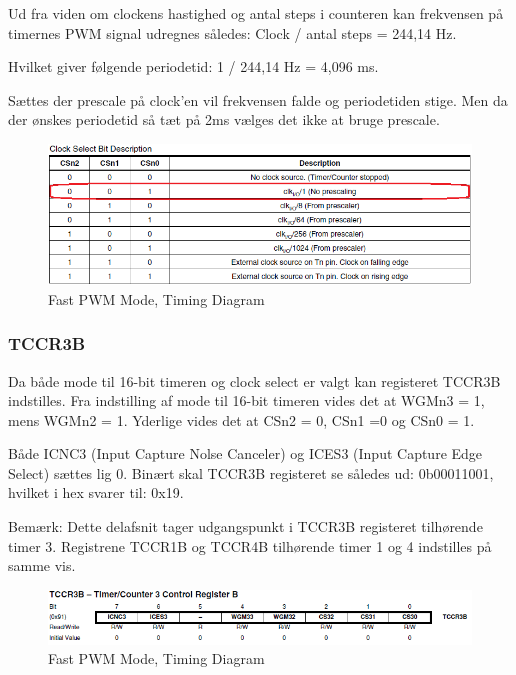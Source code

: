 Ud fra viden om clockens hastighed og antal steps i counteren kan frekvensen på timernes PWM signal udregnes således: Clock / antal steps = 244,14 Hz.  

Hvilket giver følgende periodetid: 1 / 244,14 Hz = 4,096 ms.

Sættes der prescale på clock’en vil frekvensen falde og periodetiden stige. Men da der ønskes periodetid så tæt på 2ms vælges det ikke at bruge prescale. 

\begin{figure}[H]
	\centering
	\includegraphics[width=1.\textwidth]{Billeder/Timer/4_CS.png}
	\caption{Fast PWM Mode, Timing Diagram}
	\label{fig:Timing_diagram}
\end{figure}
  

\subsubsection*{TCCR3B}
Da både mode til 16-bit timeren og clock select er valgt kan registeret TCCR3B indstilles. Fra indstilling af mode til 16-bit timeren vides det at WGMn3 = 1, mens WGMn2 = 1. Yderlige vides det at CSn2 = 0, CSn1 =0 og CSn0 = 1. 

Både ICNC3 (Input Capture Nolse Canceler) og ICES3 (Input Capture Edge Select) sættes lig 0.
Binært skal TCCR3B registeret se således ud: 0b00011001, hvilket i hex svarer til: 0x19. 

Bemærk: Dette delafsnit tager udgangspunkt i TCCR3B registeret tilhørende timer 3.  Registrene TCCR1B og TCCR4B tilhørende timer 1 og 4 indstilles på samme vis.

\begin{figure}[H]
	\centering
	\includegraphics[width=1.\textwidth]{Billeder/Timer/5_TCCT3B.png}
	\caption{Fast PWM Mode, Timing Diagram}
	\label{fig:Timing_diagram}
\end{figure}



